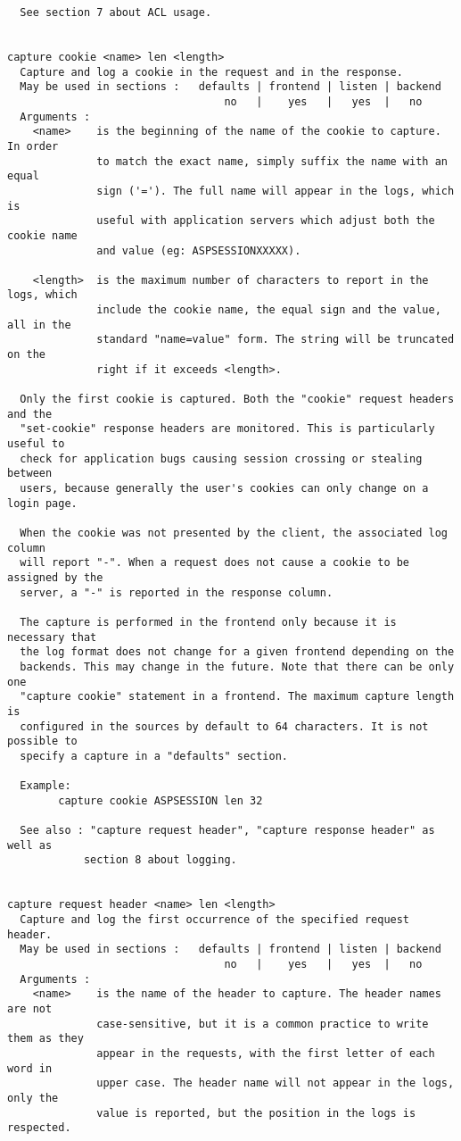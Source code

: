 \begin{verbatim}
  See section 7 about ACL usage.


capture cookie <name> len <length>
  Capture and log a cookie in the request and in the response.
  May be used in sections :   defaults | frontend | listen | backend
                                  no   |    yes   |   yes  |   no
  Arguments :
    <name>    is the beginning of the name of the cookie to capture. In order
              to match the exact name, simply suffix the name with an equal
              sign ('='). The full name will appear in the logs, which is
              useful with application servers which adjust both the cookie name
              and value (eg: ASPSESSIONXXXXX).

    <length>  is the maximum number of characters to report in the logs, which
              include the cookie name, the equal sign and the value, all in the
              standard "name=value" form. The string will be truncated on the
              right if it exceeds <length>.

  Only the first cookie is captured. Both the "cookie" request headers and the
  "set-cookie" response headers are monitored. This is particularly useful to
  check for application bugs causing session crossing or stealing between
  users, because generally the user's cookies can only change on a login page.

  When the cookie was not presented by the client, the associated log column
  will report "-". When a request does not cause a cookie to be assigned by the
  server, a "-" is reported in the response column.

  The capture is performed in the frontend only because it is necessary that
  the log format does not change for a given frontend depending on the
  backends. This may change in the future. Note that there can be only one
  "capture cookie" statement in a frontend. The maximum capture length is
  configured in the sources by default to 64 characters. It is not possible to
  specify a capture in a "defaults" section.

  Example:
        capture cookie ASPSESSION len 32

  See also : "capture request header", "capture response header" as well as
            section 8 about logging.


capture request header <name> len <length>
  Capture and log the first occurrence of the specified request header.
  May be used in sections :   defaults | frontend | listen | backend
                                  no   |    yes   |   yes  |   no
  Arguments :
    <name>    is the name of the header to capture. The header names are not
              case-sensitive, but it is a common practice to write them as they
              appear in the requests, with the first letter of each word in
              upper case. The header name will not appear in the logs, only the
              value is reported, but the position in the logs is respected.


\end{verbatim}
